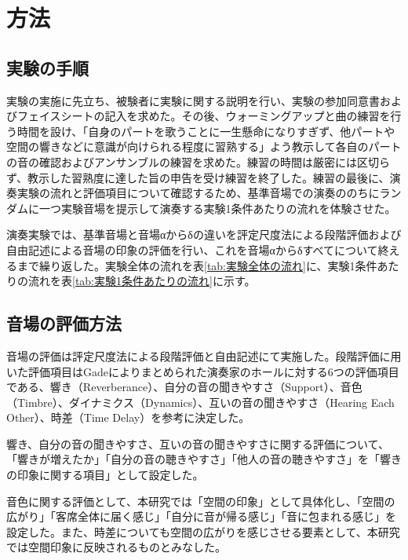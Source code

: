 \documentclass[11pt,a4j]{jreport}
\begin{document}

\newpage

\section{方法}

\subsection{実験の手順}

実験の実施に先立ち、被験者に実験に関する説明を行い、実験の参加同意書およびフェイスシートの記入を求めた。その後、ウォーミングアップと曲の練習を行う時間を設け、「自身のパートを歌うことに一生懸命になりすぎず、他パートや空間の響きなどに意識が向けられる程度に習熟する」よう教示して各自のパートの音の確認およびアンサンブルの練習を求めた。練習の時間は厳密には区切らず、教示した習熟度に達した旨の申告を受け練習を終了した。練習の最後に、演奏実験の流れと評価項目について確認するため、基準音場での演奏ののちにランダムに一つ実験音場を提示して演奏する実験1条件あたりの流れを体験させた。

演奏実験では、基準音場と音場αからδの違いを評定尺度法による段階評価および自由記述による音場の印象の評価を行い、これを音場αからδすべてについて終えるまで繰り返した。実験全体の流れを表\ref{tab:実験全体の流れ}に、実験1条件あたりの流れを表\ref{tab:実験1条件あたりの流れ}に示す。

\subsection{音場の評価方法}
音場の評価は評定尺度法による段階評価と自由記述にて実施した。段階評価に用いた評価項目はGade\cite{Gade1989I}によりまとめられた演奏家のホールに対する6つの評価項目である、響き（Reverberance）、自分の音の聞きやすさ（Support）、音色（Timbre）、ダイナミクス（Dynamics）、互いの音の聞きやすさ（Hearing Each Other）、時差（Time Delay）を参考に決定した。

響き、自分の音の聞きやすさ、互いの音の聞きやすさに関する評価について、「響きが増えたか」「自分の音の聴きやすさ」「他人の音の聴きやすさ」を「響きの印象に関する項目」として設定した。

音色に関する評価として、本研究では「空間の印象」として具体化し、「空間の広がり」「客席全体に届く感じ」「自分に音が帰る感じ」「音に包まれる感じ」を設定した。また、時差についても空間の広がりを感じさせる要素として、本研究では空間印象に反映されるものとみなした。
\end{document}
